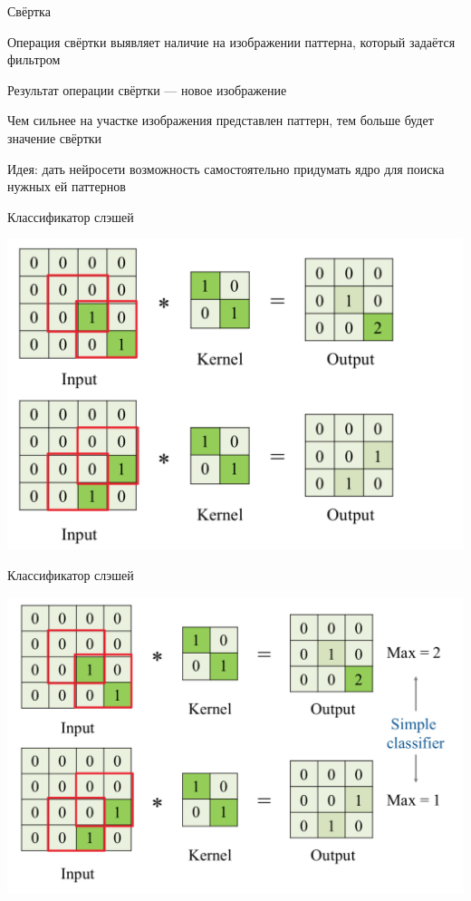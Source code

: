 \documentclass[notes,12pt, aspectratio=169]{beamer}
\newenvironment{wideitemize}{\itemize\addtolength{\itemsep}{10pt}}{\enditemize}
\begin{document}
\begin{frame}{Свёртка}
\begin{wideitemize}
	\item  Операция свёртки выявляет наличие на изображении паттерна, который задаётся фильтром
	\item Результат операции свёртки — новое изображение
	\item Чем сильнее на участке изображения представлен паттерн, тем больше будет значение свёртки
	\item \alert{Идея:} дать нейросети возможность самостоятельно придумать ядро для поиска нужных ей паттернов
\end{wideitemize}
\end{frame}


\begin{frame}{Классификатор слэшей}
\begin{center}
	\includegraphics[width=.75\linewidth]{conv_1.png}
\end{center}
\end{frame}


\begin{frame}{Классификатор слэшей}
\begin{center}
	\includegraphics[width=.8\linewidth]{conv_2.png}
\end{center}
\end{frame}
\end{document}
